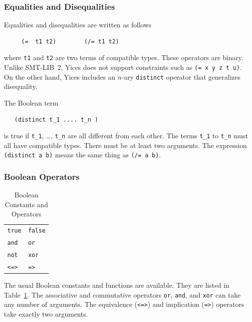 \documentclass[11pt,twoside,fleqn,openright,titlepage]{cslreport}
\begin{document}
\subsubsection*{Equalities and Disequalities}

Equalities and disequalities are written as follows
\begin{small}
\begin{verbatim}
     (=  t1 t2)        (/= t1 t2)
\end{verbatim}
\end{small}
where \texttt{t1} and \texttt{t2} are two terms of compatible
types. These operators are binary. Unlike SMT-LIB~2, Yices does not
support constraints such as \texttt{(= x y z t u)}. On the other hand,
Yices includes an $n$-ary \texttt{distinct} operator that generalizes
disequality.

\medskip\noindent
The Boolean term
\begin{small}
\begin{verbatim}
   (distinct t_1 .... t_n )
\end{verbatim}
\end{small}
is true if \texttt{t\_1}, \ldots, \texttt{t\_n} are all different
from each other. The terms \texttt{t\_1} to \texttt{t\_n} must all
have compatible types.  There must be at least two arguments. The
expression \texttt{(distinct a b)} means the same thing as \texttt{(/= a
  b)}.

\subsubsection*{Boolean Operators}

\begin{table}[h]
\begin{small}
\begin{center}
\begin{tabular}{|p{2cm}|p{2cm}|}
\hline
\texttt{true} & \texttt{false} \\
\texttt{and} & \texttt{or}  \\
\texttt{not} & \texttt{xor}  \\
\texttt{<=>} & \texttt{=>}  \\
\hline
\end{tabular}
\end{center}
\end{small}
\caption{Boolean Constants and Operators}
\label{Boolean-Operators}
\end{table}

\noindent
The usual Boolean constants and functions are available. They are
listed in Table~\ref{Boolean-Operators}.  The associative and
commutative operators \texttt{or}, \texttt{and}, and \texttt{xor} can
take any number of arguments. The equivalence (\texttt{<=>}) and
implication (\texttt{=>}) operators take exactly two arguments.
\end{document}
